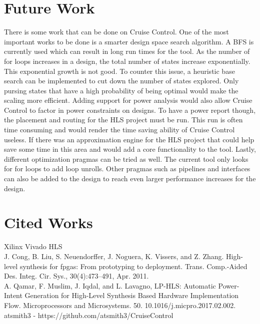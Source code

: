 \documentclass[letterpaper, 10 pt, conference]{IEEEconf}  %
\begin{document}
\section{Future Work}
There is some work that can be done on Cruise Control. One of the most important works to be done is a smarter design space search algorithm. A BFS is currently used which can result in long run times for the tool. As the number of for loops increases in a design, the total number of states increase exponentially. This exponential growth is not good. To counter this issue, a heuristic base search can be implemented to cut down the number of states explored. Only pursing states that have a high probability of being optimal would make the scaling more efficient. \newline
Adding support for power analysis would also allow Cruise Control to factor in power constraints on designs. To have a power report though, the placement and routing for the HLS project must be run. This run is often time consuming and would render the time saving ability of Cruise Control useless. If there was an approximation engine for the HLS project that could help save some time in this area and would add a core functionality to the tool. \newline
Lastly, different optimization pragmas can be tried as well. The current tool only looks for for loops to add loop unrolls. Other pragmas such as pipelines and interfaces can also be added to the design to reach even larger performance increases for the design. 


\section{Cited Works}
\noindent [1] Xilinx Vivado HLS \\
\noindent [2] J. Cong, B. Liu, S. Neuendorffer, J. Noguera, K. Vissers, and
Z. Zhang. High-level synthesis for fpgas: From prototyping
to deployment. Trans. Comp.-Aided Des. Integ. Cir. Sys.,
30(4):473–491, Apr. 2011.\\
\noindent [3] A. Qamar, F. Muslim, J. Iqdal, and L. Lavagno, LP-HLS: Automatic Power-Intent Generation for High-Level Synthesis Based Hardware Implementation Flow. Microprocessors and Microsystems. 50. 10.1016/j.micpro.2017.02.002.  \\
\noindent [4] atsmith3 - https://github.com/atsmith3/CruiseControl
\end{document}
